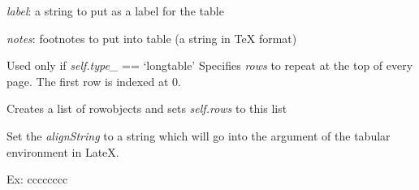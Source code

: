 \documentclass[letterpaper,10pt,english]{sphinxmanual}
\begin{document}
\begin{fulllineitems}
\begin{fulllineitems}
\end{fulllineitems}


\begin{fulllineitems}
\label{summary:tablemaker.Table.setLabel}
\emph{label}: a string to put as a label for the table

\end{fulllineitems}


\begin{fulllineitems}
\label{summary:tablemaker.Table.setNotes}
\emph{notes}: footnotes to put into table (a string in TeX format)

\end{fulllineitems}


\begin{fulllineitems}
\label{summary:tablemaker.Table.setRepeat}
Used only if \emph{self.type\_} == `longtable'
Specifies \emph{rows} to repeat at the top of every page. 
The first row is indexed at 0.

\end{fulllineitems}


\begin{fulllineitems}
\label{summary:tablemaker.Table.setRows}
Creates a list of rowobjects and sets \emph{self.rows} to this list

\end{fulllineitems}


\begin{fulllineitems}
\label{summary:tablemaker.Table.setTableAlignment}
Set the \emph{alignString} to a string which will go into
the argument of the tabular environment in LateX.

Ex: cccccccc

\end{fulllineitems}


\end{fulllineitems}
\end{document}
